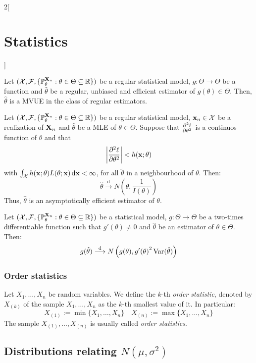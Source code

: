 \documentclass[../../../main.tex]{subfiles}
\begin{document}
\begin{multicols}{2}[\section{Statistics}]
\begin{definition}
  \end{definition}
  \begin{proposition}
    Let $(\mathcal{X},\mathcal{F},\{\mathbb{P}_{\theta}^{\boldsymbol{\mathrm{X}}_n}:\theta\in\Theta\subseteq\mathbb{R}\})$ be a regular statistical model, $g:\Theta\rightarrow\Theta$ be a function and ${\hat\theta}$ be a regular, unbiased and efficient estimator of $g({\theta})\in\Theta$. Then, $\hat\theta$ is a MVUE in the class of regular estimators.
  \end{proposition}
  \begin{theorem}
    Let $(\mathcal{X},\mathcal{F},\{\mathbb{P}_{\theta}^{\boldsymbol{\mathrm{X}}_n}:\theta\in\Theta\subseteq \mathbb{R}\})$ be a regular statistical model, $\boldsymbol{\mathrm{x}}_n\in\mathcal{X}$ be a realization of $\boldsymbol{\mathrm{X}}_n$ and ${\hat\theta}$ be a MLE of ${\theta}\in\Theta$. Suppose that $\pdv[2]{\ell}{\theta}$ is a continuos function of $\theta$ and that $$\left|\pdv[2]{\ell}{\theta}(\tilde{\theta};\boldsymbol{\mathrm{x}}_n)\right|<h(\boldsymbol{\mathrm{x}};\theta)$$
    with $\int_\mathcal{X}h(\boldsymbol{\mathrm{x}};\theta)L(\theta;\boldsymbol{\mathrm{x}})\dd{\boldsymbol{\mathrm{x}}}<\infty$, for all $\tilde{\theta}$ in a neighbourhood of $\theta$. Then:
    $$\hat\theta\overset{\text{d}}{\longrightarrow}N\left(\theta,\frac{1}{I(\theta)}\right)$$
    Thus, ${\hat\theta}$ is an asymptotically efficient estimator of $\theta$.
  \end{theorem}
  \begin{theorem}
    Let $(\mathcal{X},\mathcal{F},\{\mathbb{P}_{\theta}^{\boldsymbol{\mathrm{X}}_n}:\theta\in\Theta\subseteq\mathbb{R}\})$ be a statistical model, $g:\Theta\rightarrow\Theta$ be a two-times differentiable function such that $g'(\theta)\ne 0$ and $\hat\theta$ be an estimator of $\theta\in\Theta$. Then:
    $$g(\hat\theta)\overset{\text{d}}{\longrightarrow}N\left(g(\theta),{g'(\theta)}^2\operatorname{Var}(\hat\theta)\right)$$
  \end{theorem}
  \subsubsection{Order statistics}
  \begin{definition}
    Let $X_1,\ldots,X_n$ be random variables. We define the $k$-th \emph{order statistic}, denoted by $X_{(k)}$ of the sample $X_1,\ldots,X_n$ as the $k$-th smallest value of it. In particular:
    $$X_{(1)}:=\min\{X_1,\ldots,X_n\}\quad X_{(n)}:=\max\{X_1,\ldots,X_n\}$$
    The sample $X_{(1)},\ldots,X_{(n)}$ is usually called \emph{order statistics}.
  \end{definition}
  \subsection{Distributions relating \texorpdfstring{$N(\mu,\sigma^2)$}{N(mu,sigma2)}}

\end{multicols}
\end{document}
